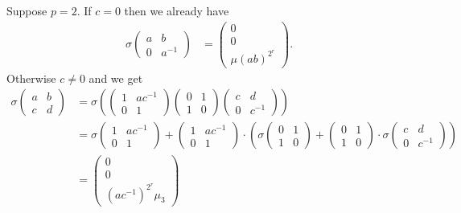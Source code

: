 Suppose $p=2$.
	If $c=0$ then we already have
	\begin{align*}
	\sigma
			\left(\begin{matrix}a & b \\ 0 & a^{-1}\end{matrix}\right)
	&=
	\left(\begin{matrix}0 \\ 0 \\ \mu(ab)^{2^r}\end{matrix}\right).
	\end{align*}
	Otherwise $c\neq 0$ and we get
	\begin{align*}
	\sigma
			\left(\begin{matrix}a & b \\ c & d\end{matrix}\right)
			 &=
	\sigma\left(
			\left(\begin{matrix} 1 & ac^{-1} \\ 0 & 1 \end{matrix}\right)
			\left(\begin{matrix} 0 & 1 \\ 1 & 0 \end{matrix}\right)
			\left(\begin{matrix} c & d \\ 0 & c^{-1} \end{matrix}\right)
			\right) \\
		&=
	\sigma
			\left(\begin{matrix} 1 & ac^{-1} \\ 0 & 1 \end{matrix}\right)
			 + 
	\left(\begin{matrix} 1 & ac^{-1} \\ 0 & 1 \end{matrix}\right)\cdot
	\left(
			\sigma
				\left(\begin{matrix} 0 & 1 \\ 1 & 0 \end{matrix}\right)
				 +
			\left(\begin{matrix} 0 & 1 \\ 1 & 0 \end{matrix}\right)\cdot
			\sigma
				\left(\begin{matrix} c & d \\ 0 & c^{-1} \end{matrix}\right)
			\right)\\
	&=
\left(\begin{matrix} 0 \\ 0 \\ (ac^{-1})^{2^r}\mu_3 \end{matrix}\right)

\end{align*}
